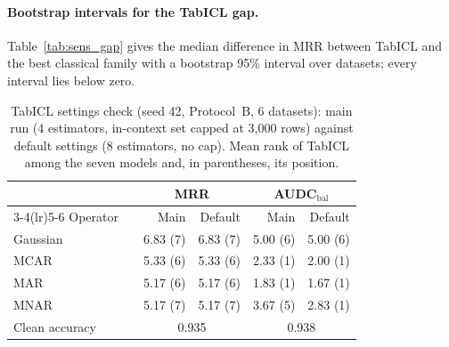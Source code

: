 \documentclass[pdflatex,sn-mathphys]{sn-jnl}
\theoremstyle{thmstyleone}
\begin{document}
\paragraph{Bootstrap intervals for the TabICL gap.} Table~\ref{tab:sens_gap} gives the median difference in MRR between TabICL and the best classical family with a bootstrap 95\% interval over datasets; every interval lies below zero.

\begin{table}[t]
\centering
\footnotesize
\caption{TabICL settings check (seed 42, Protocol~B, 6 datasets): main run (4 estimators, in-context set capped at 3,000 rows) against default settings (8 estimators, no cap). Mean rank of TabICL among the seven models and, in parentheses, its position.}
\label{tab:sens_settings}
\begin{tabular}{@{}llrrrr@{}}
\toprule
 & & \multicolumn{2}{c}{MRR} & \multicolumn{2}{c}{AUDC$_{\mathrm{bal}}$} \\
\cmidrule(lr){3-4}\cmidrule(lr){5-6}
Operator & & Main & Default & Main & Default \\
\midrule
Gaussian & & 6.83 (7) & 6.83 (7) & 5.00 (6) & 5.00 (6) \\
MCAR & & 5.33 (6) & 5.33 (6) & 2.33 (1) & 2.00 (1) \\
MAR & & 5.17 (6) & 5.17 (6) & 1.83 (1) & 1.67 (1) \\
MNAR & & 5.17 (7) & 5.17 (7) & 3.67 (5) & 2.83 (1) \\
\midrule
Clean accuracy & & \multicolumn{2}{c}{0.935} & \multicolumn{2}{c}{0.938} \\
\bottomrule
\end{tabular}
\end{table}
\end{document}
